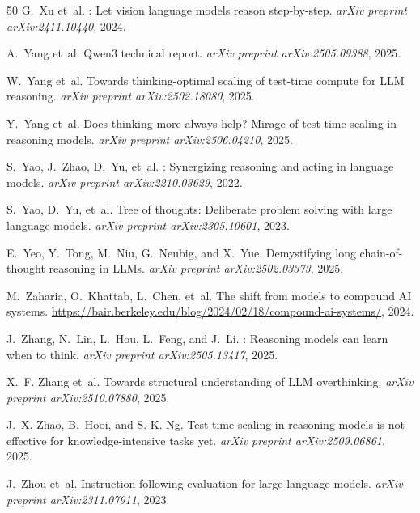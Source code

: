 \documentclass[11pt]{article}
\begin{document}
\begin{thebibliography}{50}
G.~Xu et~al.
: Let vision language models reason step-by-step.
\newblock \emph{arXiv preprint arXiv:2411.10440}, 2024.

A.~Yang et~al.
\newblock Qwen3 technical report.
\newblock \emph{arXiv preprint arXiv:2505.09388}, 2025.

W.~Yang et~al.
\newblock Towards thinking-optimal scaling of test-time compute for {LLM} reasoning.
\newblock \emph{arXiv preprint arXiv:2502.18080}, 2025.

Y.~Yang et~al.
\newblock Does thinking more always help? Mirage of test-time scaling in reasoning models.
\newblock \emph{arXiv preprint arXiv:2506.04210}, 2025.

S.~Yao, J.~Zhao, D.~Yu, et~al.
: Synergizing reasoning and acting in language models.
\newblock \emph{arXiv preprint arXiv:2210.03629}, 2022.

S.~Yao, D.~Yu, et~al.
\newblock Tree of thoughts: Deliberate problem solving with large language models.
\newblock \emph{arXiv preprint arXiv:2305.10601}, 2023.

E.~Yeo, Y.~Tong, M.~Niu, G.~Neubig, and X.~Yue.
\newblock Demystifying long chain-of-thought reasoning in {LLMs}.
\newblock \emph{arXiv preprint arXiv:2502.03373}, 2025.

M.~Zaharia, O.~Khattab, L.~Chen, et~al.
\newblock The shift from models to compound {AI} systems.
\newblock \url{https://bair.berkeley.edu/blog/2024/02/18/compound-ai-systems/}, 2024.

J.~Zhang, N.~Lin, L.~Hou, L.~Feng, and J.~Li.
: Reasoning models can learn when to think.
\newblock \emph{arXiv preprint arXiv:2505.13417}, 2025.

X.~F. Zhang et~al.
\newblock Towards structural understanding of {LLM} overthinking.
\newblock \emph{arXiv preprint arXiv:2510.07880}, 2025.

J.~X. Zhao, B.~Hooi, and S.-K. Ng.
\newblock Test-time scaling in reasoning models is not effective for knowledge-intensive tasks yet.
\newblock \emph{arXiv preprint arXiv:2509.06861}, 2025.

J.~Zhou et~al.
\newblock Instruction-following evaluation for large language models.
\newblock \emph{arXiv preprint arXiv:2311.07911}, 2023.

\end{thebibliography}
\end{document}
